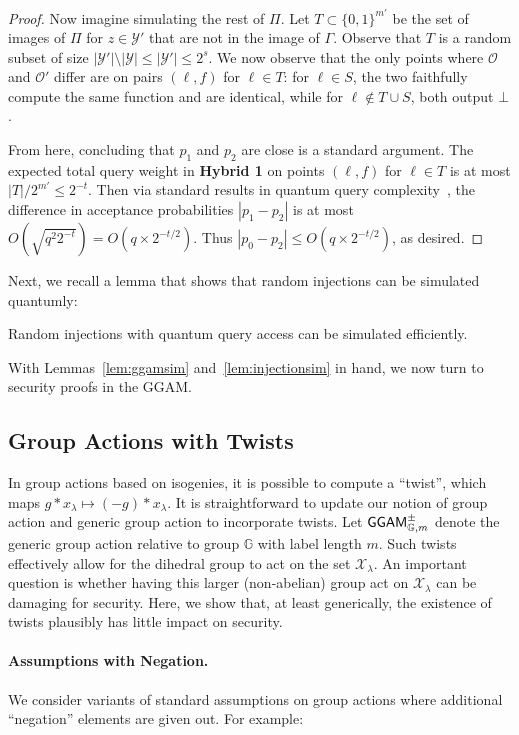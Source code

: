 \documentclass{article}\usepackage[a4paper,margin=20mm]{geometry}
\numberwithin{theorem}{section}
\numberwithin{equation}{section}
\newcommand{\G}{\mathbb{G}}
\newcommand{\Os}{{\mathcal{O}}}
\newcommand{\Xs}{{\mathcal{X}}}
\newcommand{\Ys}{{\mathcal{Y}}}
\newcommand{\GGAM}{{\sf GGAM}}
\begin{document}
\begin{proof}
	Now imagine simulating the rest of $\Pi$. Let $T\subset\{0,1\}^{m'}$ be the set of images of $\Pi$ for $z\in \Ys'$ that are not in the image of $\Gamma$. Observe that $T$ is a random subset of size $|\Ys'|\setminus |\Ys|\leq |\Ys'|\leq 2^s$. We now observe that the only points where $\Os$ and $\Os'$ differ are on pairs $(\ell,f)$ for $\ell\in T$: for $\ell\in S$, the two faithfully compute the same function and are identical, while for $\ell\notin T\cup S$, both output $\bot$.
	
	
	From here, concluding that $p_1$ and $p_2$ are close is a standard argument. The expected total query weight in {\bf Hybrid 1} on points $(\ell,f)$ for $\ell\in T$ is at most $|T|/2^{m'}\leq 2^{-t}$. Then via standard results in quantum query complexity~\cite{BBBV97}, the difference in acceptance probabilities $|p_1-p_2|$ is at most $O(\sqrt{q^2 2^{-t}})=O(q\times 2^{-t/2})$. Thus $|p_0-p_2|\leq O(q\times 2^{-t/2})$, as desired.\end{proof}

Next, we recall a lemma that shows that random injections can be simulated quantumly:

\begin{lemma}\label{lem:injectionsim} Random injections with quantum query access can be simulated efficiently.
\end{lemma}

With Lemmas~\ref{lem:ggamsim} and~\ref{lem:injectionsim} in hand, we now turn to security proofs in the GGAM.

\subsection{Group Actions with Twists}

In group actions based on isogenies, it is possible to compute a ``twist'', which maps $g*x_\lambda\mapsto (-g)*x_\lambda$. It is straightforward to update our notion of group action and generic group action to incorporate twists. Let $\GGAM^\pm_{\G,m}$ denote the generic group action relative to group $\G$ with label length $m$. Such twists effectively allow for the dihedral group to act on the set $\Xs_\lambda$. An important question is whether having this larger (non-abelian) group act on $\Xs_\lambda$ can be damaging for security. Here, we show that, at least generically, the existence of twists plausibly has little impact on security.

\paragraph{Assumptions with Negation.} We consider variants of standard assumptions on group actions where additional ``negation'' elements are given out. For example:
\end{document}
